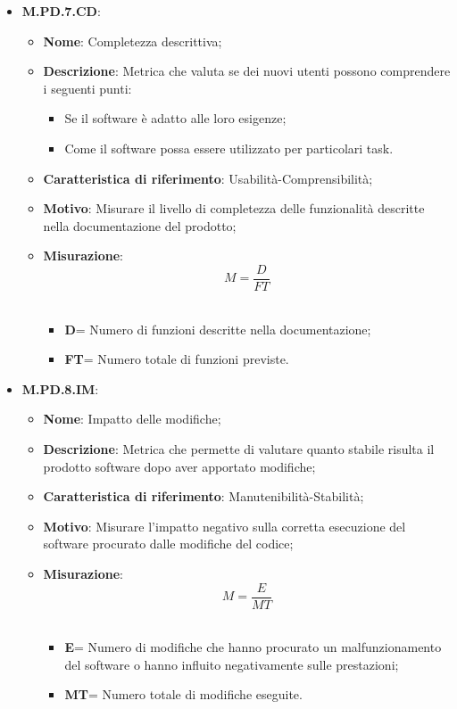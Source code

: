 \documentclass[10pt, a4paper]{article}
\begin{document}
\begin{itemize}
    \item \textbf{M.PD.7.CD}:
    \begin{itemize}
        \item \textbf{Nome}: Completezza descrittiva;
        \item \textbf{Descrizione}: Metrica che valuta se dei nuovi utenti possono comprendere i seguenti punti:
        \begin{itemize}
            \item Se il software è adatto alle loro esigenze; 
            \item Come il software possa essere utilizzato per particolari task.
        \end{itemize} 
        \item \textbf{Caratteristica di riferimento}: Usabilità-Comprensibilità;
        \item \textbf{Motivo}: Misurare il livello di completezza delle funzionalità descritte nella documentazione del prodotto; 
       \item \textbf{Misurazione}:   \[ M=\frac{D}{FT} \] \\
       \begin{itemize}
           \item \textbf{D}= Numero di funzioni descritte nella documentazione;
           \item \textbf{FT}= Numero totale di funzioni previste.\\
       \end{itemize}
    \end{itemize}



    \item \textbf{M.PD.8.IM}:
    \begin{itemize}
        \item \textbf{Nome}: Impatto delle modifiche;
        \item \textbf{Descrizione}: Metrica che permette di valutare quanto stabile risulta il prodotto software dopo aver apportato modifiche;
        \item \textbf{Caratteristica di riferimento}: Manutenibilità-Stabilità;
        \item \textbf{Motivo}: Misurare l'impatto negativo sulla corretta esecuzione del software procurato dalle modifiche del codice; 
       \item \textbf{Misurazione}:   \[ M=\frac{E}{MT} \] \\
       \begin{itemize}
           \item \textbf{E}= Numero di modifiche che hanno procurato un malfunzionamento del software o hanno influito negativamente sulle prestazioni;
           \item \textbf{MT}= Numero totale di modifiche eseguite.\\
       \end{itemize}
    \end{itemize}

\end{itemize}
\end{document}
